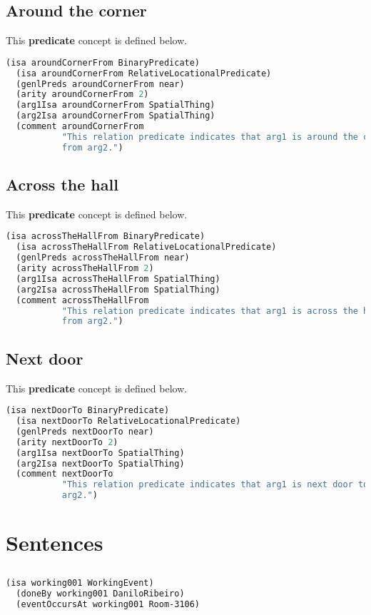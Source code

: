 \documentclass[11pt]{article}
\begin{document}
\subsection{Around the corner}
This \textbf{predicate} concept is defined below.
\begin{lstlisting}[language=lisp]
  (isa aroundCornerFrom BinaryPredicate)
  (isa aroundCornerFrom RelativeLocationalPredicate)
  (genlPreds aroundCornerFrom near)
  (arity aroundCornerFrom 2)
  (arg1Isa aroundCornerFrom SpatialThing)
  (arg2Isa aroundCornerFrom SpatialThing)
  (comment aroundCornerFrom
           "This relation predicate indicates that arg1 is around the corner 
           from arg2.")
\end{lstlisting}

\subsection{Across the hall}
This \textbf{predicate} concept is defined below.
\begin{lstlisting}[language=lisp]
  (isa acrossTheHallFrom BinaryPredicate)
  (isa acrossTheHallFrom RelativeLocationalPredicate)
  (genlPreds acrossTheHallFrom near)
  (arity acrossTheHallFrom 2)
  (arg1Isa acrossTheHallFrom SpatialThing)
  (arg2Isa acrossTheHallFrom SpatialThing)
  (comment acrossTheHallFrom
           "This relation predicate indicates that arg1 is across the hall
           from arg2.")
\end{lstlisting}

\subsection{Next door}
This \textbf{predicate} concept is defined below.
\begin{lstlisting}[language=lisp]
  (isa nextDoorTo BinaryPredicate)
  (isa nextDoorTo RelativeLocationalPredicate)
  (genlPreds nextDoorTo near)
  (arity nextDoorTo 2)
  (arg1Isa nextDoorTo SpatialThing)
  (arg2Isa nextDoorTo SpatialThing)
  (comment nextDoorTo
           "This relation predicate indicates that arg1 is next door to
           arg2.")
\end{lstlisting}

\section{Sentences}
\subsection{}
\begin{lstlisting}[language=lisp]
  (isa working001 WorkingEvent)
  (doneBy working001 DaniloRibeiro)
  (eventOccursAt working001 Room-3106)
\end{lstlisting}
\end{document}
